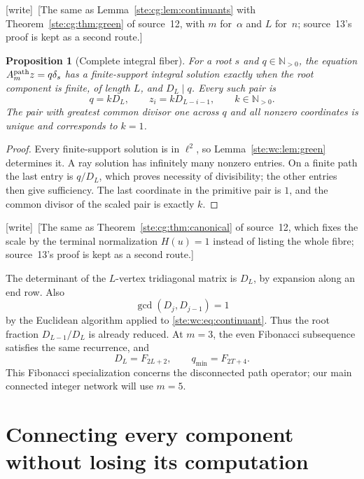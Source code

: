 \documentclass[11pt,letterpaper]{article}
\newtheorem{proposition}[theorem]{Proposition}
\theoremstyle{definition}
\theoremstyle{remark}
\newcommand{\N}{\mathbb N}
\newcommand{\wtag}{\textup{[write]}}
\begin{document}
\wtag\ [The same as Lemma~\ref{ste:cg:lem:continuants} with Theorem~\ref{ste:cg:thm:green} of source~12, with $m$ for~$\alpha$ and $L$ for~$n$; source~13's proof is kept as a second route.]


\begin{proposition}[Complete integral fiber]\label{ste:wc:prop:denominator}
For a root $s$ and $q\in\N_{>0}$, the equation
$A^{\rm path}_m z=q\delta_s$ has a finite-support integral solution exactly
when the root component is finite, of length $L$, and $D_L\mid q$.
Every such pair is
\begin{equation}\label{ste:wc:eq:integerfiber}
 q=kD_L,\qquad z_i=kD_{L-i-1},\qquad k\in\N_{>0}.
\end{equation}
The pair with greatest common divisor one across $q$ and all nonzero
coordinates is unique and corresponds to $k=1$.
\end{proposition}
\begin{proof}
Every finite-support solution is in $\ell^2$, so Lemma~\ref{ste:wc:lem:green} determines
it. A ray solution has infinitely many nonzero entries. On a finite path
the last entry is $q/D_L$, which proves necessity of divisibility; the other
entries then give sufficiency. The last coordinate in the primitive pair
is $1$, and the common divisor of the scaled pair is exactly $k$.
\end{proof}

\wtag\ [The same as Theorem~\ref{ste:cg:thm:canonical} of source~12, which fixes the scale by the terminal normalization $H(u)=1$ instead of listing the whole fibre; source~13's proof is kept as a second route.]


The determinant of the $L$-vertex tridiagonal matrix is $D_L$, by expansion
along an end row. Also
\begin{equation}\label{ste:wc:eq:gcd}
 \gcd(D_j,D_{j-1})=1
\end{equation}
by the Euclidean algorithm applied to \eqref{ste:wc:eq:continuant}. Thus the root
fraction $D_{L-1}/D_L$ is already reduced. At $m=3$, the even Fibonacci
subsequence satisfies the same recurrence, and
\[
 D_L=F_{2L+2},\qquad q_{\min}=F_{2T+4}.
\]
This Fibonacci specialization concerns the disconnected path operator;
our main connected integer network will use $m=5$.

\section{Connecting every component without losing its computation}
\label{ste:wc:sec:connected}
\end{document}
